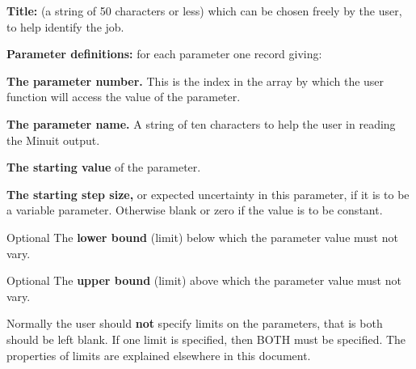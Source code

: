 \begin{UL}
\item {\bf Title:} (a string of 50 characters or less)
      which can be chosen freely by the user, to help identify the job.
\item {\bf Parameter definitions:} for each parameter one record giving:
      \begin{OL}
      \item {\bf The parameter number.}
            This is the index in the array  by which the
            user function  will access the value of the parameter.
      \item {\bf The parameter name.}
            A string of ten characters to help the user in
            reading the Minuit output.
      \item {\bf The starting value} of the parameter.
      \item {\bf The starting step size,}
             or expected uncertainty in this parameter,
             if it is to be a variable parameter. Otherwise blank or zero if the
             value is to be constant.
      \item [Optional] The {\bf lower bound}
            (limit) below which the parameter value must not vary.
      \item [Optional] The {\bf upper bound}
            (limit) above which the parameter value must not vary.
      \end{OL}
      Normally the user should {\bf not} specify limits on the parameters, that is
      both should be left blank. If one limit is specified, then BOTH must
      be specified. The properties of limits are explained elsewhere
      in this document.
 

\end{UL}
